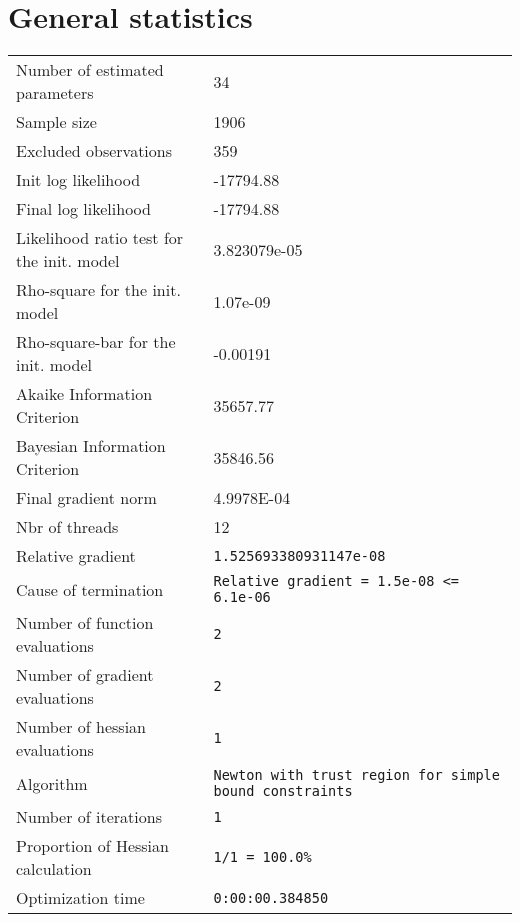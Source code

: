



\section{General statistics}
\begin{tabular}{ll}
Number of estimated parameters & 34 \\
Sample size & 1906 \\
Excluded observations & 359 \\
Init log likelihood & -17794.88 \\
Final log likelihood & -17794.88 \\
Likelihood ratio test for the init. model & 3.823079e-05 \\
Rho-square for the init. model & 1.07e-09 \\
Rho-square-bar for the init. model & -0.00191 \\
Akaike Information Criterion & 35657.77 \\
Bayesian Information Criterion & 35846.56 \\
Final gradient norm & 4.9978E-04 \\
Nbr of threads & 12 \\
Relative gradient & \verb$1.525693380931147e-08$ \\
Cause of termination & \verb$Relative gradient = 1.5e-08 <= 6.1e-06$ \\
Number of function evaluations & \verb$2$ \\
Number of gradient evaluations & \verb$2$ \\
Number of hessian evaluations & \verb$1$ \\
Algorithm & \verb$Newton with trust region for simple bound constraints$ \\
Number of iterations & \verb$1$ \\
Proportion of Hessian calculation & \verb$1/1 = 100.0%$ \\
Optimization time & \verb$0:00:00.384850$ \\
\end{tabular}

